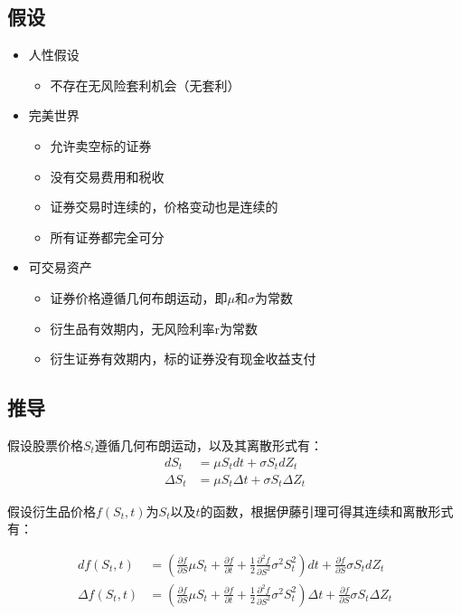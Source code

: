 \documentclass[11pt]{article}
\begin{document}
\subsection{假设}
\begin{itemize}
    \item 人性假设
          \begin{itemize}
              \item 不存在无风险套利机会（无套利）
          \end{itemize}
    \item 完美世界
          \begin{itemize}
              \item 允许卖空标的证券
              \item 没有交易费用和税收
              \item 证券交易时连续的，价格变动也是连续的
              \item 所有证券都完全可分
          \end{itemize}
    \item 可交易资产
          \begin{itemize}
              \item 证券价格遵循几何布朗运动，即$\mu$和$\sigma$为常数
              \item 衍生品有效期内，无风险利率r为常数
              \item 衍生证券有效期内，标的证券没有现金收益支付
          \end{itemize}
\end{itemize}

\subsection{推导}

假设股票价格$S_t$遵循几何布朗运动，以及其离散形式有：
\begin{align*}
    d S_t & = \mu S_t dt + \sigma S_t d Z_t \\
    \Delta S_t & = \mu S_t \Delta t + \sigma S_t \Delta Z_t
\end{align*}

假设衍生品价格$f(S_t, t)$为$S_t$以及$t$的函数，根据伊藤引理可得其连续和离散形式有：

\begin{align*}
    df(S_t,t) & = \left(\frac{\partial f}{\partial S} \mu S_t  + \frac{\partial f}{\partial t} + \frac{1}{2}\frac{\partial^2 f}{\partial S^2} \sigma^2 S_t^2 \right)dt + \frac{\partial f}{\partial S} \sigma S_t dZ_t \\
    \Delta f(S_t,t) & = \left(\frac{\partial f}{\partial S} \mu S_t  + \frac{\partial f}{\partial t} + \frac{1}{2}\frac{\partial^2 f}{\partial S^2} \sigma^2 S_t^2 \right) \Delta t + \frac{\partial f}{\partial S} \sigma S_t \Delta Z_t
\end{align*}
\end{document}
